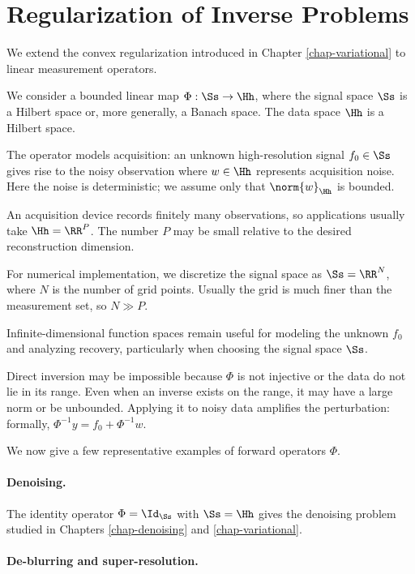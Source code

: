 \section{Regularization of Inverse Problems}

We extend the convex regularization introduced in Chapter \ref{chap-variational} to linear measurement operators.

We consider a bounded linear map $\Phi : \Ss \rightarrow \Hh$, where the signal space $\Ss$ is a Hilbert space or, more generally, a Banach space. The data space $\Hh$ is a Hilbert space.
 
The operator models acquisition: an unknown high-resolution signal $f_0 \in \Ss$ gives rise to the noisy observation
where $w \in \Hh$ represents acquisition noise. Here the noise is deterministic; we assume only that $\norm{w}_\Hh$ is bounded.

An acquisition device records finitely many observations, so applications usually take $\Hh=\RR^P$. The number $P$ may be small relative to the desired reconstruction dimension.
 
For numerical implementation, we discretize the signal space as $\Ss=\RR^N$, where $N$ is the number of grid points. Usually the grid is much finer than the measurement set, so $N \gg P$.
 
Infinite-dimensional function spaces remain useful for modeling the unknown $f_0$ and analyzing recovery, particularly when choosing the signal space $\Ss$.

Direct inversion may be impossible because $\Phi$ is not injective or the data do not lie in its range. Even when an inverse exists on the range, it may have a large norm or be unbounded. Applying it to noisy data amplifies the perturbation: formally, $\Phi^{-1}y=f_0+\Phi^{-1}w$.

We now give a few representative examples of forward operators $\Phi$.

   
\paragraph{Denoising.}

The identity operator $\Phi=\Id_\Ss$ with $\Ss=\Hh$ gives the denoising problem studied in Chapters \ref{chap-denoising} and \ref{chap-variational}.

   
\paragraph{De-blurring and super-resolution.}

